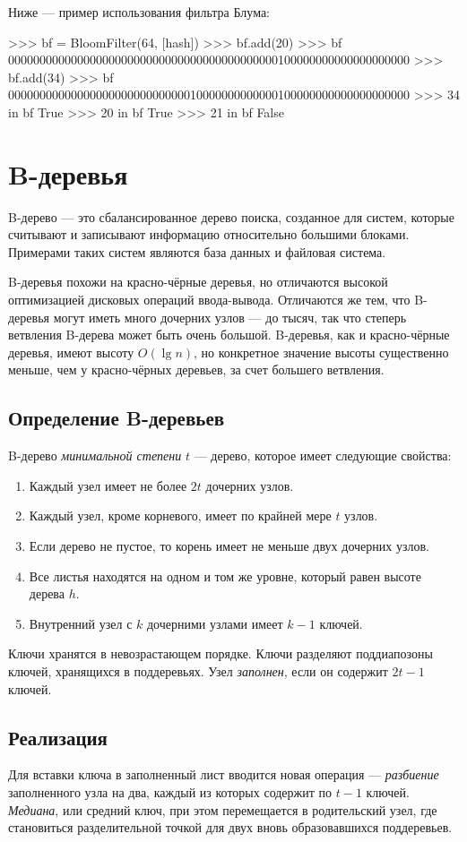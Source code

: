 Ниже — пример использования фильтра Блума:
\begin{pylst}{}{}
>>> bf = BloomFilter(64, [hash])
>>> bf.add(20)
>>> bf
0000000000000000000000000000000000000000000100000000000000000000
>>> bf.add(34)
>>> bf
0000000000000000000000000000010000000000000100000000000000000000
>>> 34 in bf
True
>>> 20 in bf
True
>>> 21 in bf
False
\end{pylst}

\section{B-деревья}
\label{sec:b-tree}
B-дерево — это сбалансированное дерево поиска, созданное для систем, которые считывают и записывают информацию относительно большими блоками. Примерами таких систем являются база данных и файловая система.

B-деревья похожи на красно-чёрные деревья, но отличаются высокой оптимизацией дисковых операций ввода-вывода. Отличаются же тем, что B-деревья могут иметь много дочерних узлов — до тысяч, так что степерь ветвления B-дерева может быть очень большой. B-деревья, как и красно-чёрные деревья, имеют высоту $O(\lg n)$, но конкретное значение высоты существенно меньше, чем у красно-чёрных деревьев, за счет большего ветвления.

\subsection{Определение B-деревьев}
B-дерево \emph{минимальной степени} $t$ — дерево, которое имеет следующие свойства:
\begin{enumerate}
  \item Каждый узел имеет не более $2t$ дочерних узлов.
  \item Каждый узел, кроме корневого, имеет по крайней мере $t$ узлов.
  \item Если дерево не пустое, то корень имеет не меньше двух дочерних узлов.
  \item Все листья находятся на одном и том же уровне, который равен высоте дерева $h$.
  \item Внутренний узел с $k$ дочерними узлами имеет $k - 1$ ключей.
\end{enumerate}

Ключи хранятся в невозрастающем порядке. Ключи разделяют поддиапозоны ключей, хранящихся в поддеревьях. Узел \emph{заполнен}, если он содержит $2t - 1$ ключей.

\subsection{Реализация}
Для вставки ключа в заполненный лист вводится новая операция — \emph{разбиение} заполненного узла на два, каждый из которых содержит по $t - 1$ ключей. \emph{Медиана}, или средний ключ,  при этом перемещается в родительский узел, где становиться разделительной точкой для двух вновь образовавшихся поддеревьев.

